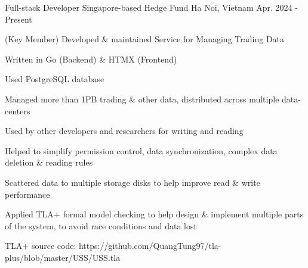 


\begin{cventries}


\cventry
{Full-stack Developer} %
{Singapore-based Hedge Fund} %
{Ha Noi, Vietnam} %
{Apr. 2024 - Present} %
{ %
\begin{cvitems}
\item{(Key Member) Developed \& maintained Service for Managing Trading Data}
\item{Written in Go (Backend) \& HTMX (Frontend)}
\item{Used PostgreSQL database}
\item{Managed more than 1PB trading \& other data, distributed across multiple data-centers}
\item{Used by other developers and researchers for writing and reading}
\item{Helped to simplify permission control, data synchronization, complex data deletion \& reading rules}
\item{Scattered data to multiple storage disks to help improve read \& write performance}
\item{Applied TLA+ formal model checking to help design \& implement multiple parts of the system, to avoid race conditions and data lost}
\item{TLA+ source code: https://github.com/QuangTung97/tla-plus/blob/master/USS/USS.tla}
\end{cvitems}
}



\end{cventries}
